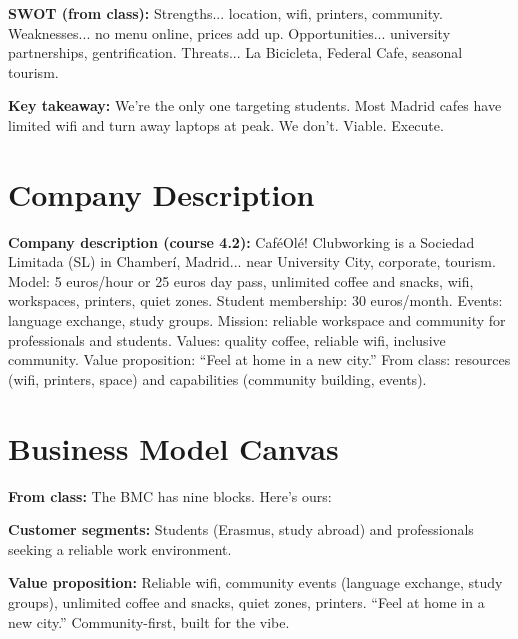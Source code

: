 \documentclass[12pt,a4paper]{article}
\begin{document}
\textbf{SWOT (from class):} Strengths... location, wifi, printers, community. Weaknesses... no menu online, prices add up. Opportunities... university partnerships, gentrification. Threats... La Bicicleta, Federal Cafe, seasonal tourism.

\textbf{Key takeaway:} We're the only one targeting students. Most Madrid cafes have limited wifi and turn away laptops at peak. We don't. Viable. Execute.

\vspace{0.5em}
\noindent{\color{sectionblue}\rule{\textwidth}{0.4pt}}

\section*{\color{sectionblue}Company Description}\label{sec:company}

\textbf{Company description (course 4.2):} Caf\'eOl\'e! Clubworking is a Sociedad Limitada (SL) in Chamber\'i, Madrid... near University City, corporate, tourism. Model: 5 euros/hour or 25 euros day pass, unlimited coffee and snacks, wifi, workspaces, printers, quiet zones. Student membership: 30 euros/month. Events: language exchange, study groups. Mission: reliable workspace and community for professionals and students. Values: quality coffee, reliable wifi, inclusive community. Value proposition: ``Feel at home in a new city.'' From class: resources (wifi, printers, space) and capabilities (community building, events).

\vspace{0.5em}
\noindent{\color{sectionblue}\rule{\textwidth}{0.4pt}}

\section*{\color{sectionblue}Business Model Canvas}\label{sec:bmc}

\textbf{From class:} The BMC has nine blocks. Here's ours:

\textbf{\textcolor{cafebrown}{Customer segments:}} Students (Erasmus, study abroad) and professionals seeking a reliable work environment.

\textbf{\textcolor{cafebrown}{Value proposition:}} Reliable wifi, community events (language exchange, study groups), unlimited coffee and snacks, quiet zones, printers. ``Feel at home in a new city.'' Community-first, built for the vibe.
\end{document}
